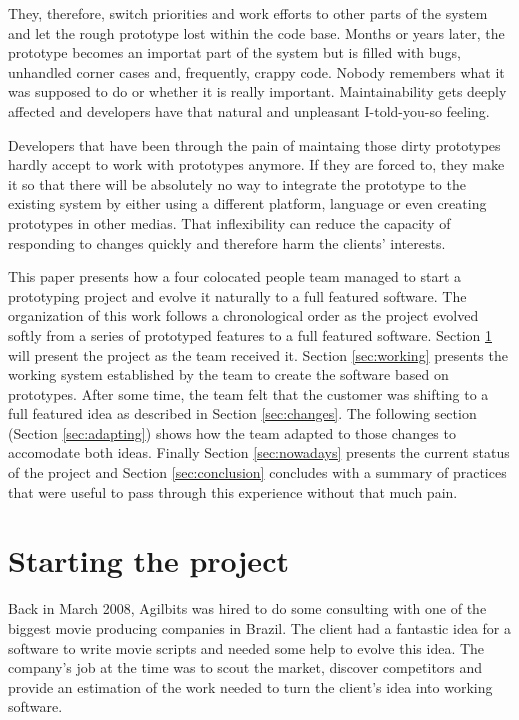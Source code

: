 \documentclass[lnbip]{svmultln}
\begin{document}
They, therefore, switch priorities and work efforts to other parts of
the system and let the rough prototype lost within the code
base. Months or years later, the prototype becomes an importat part of
the system but is filled with bugs, unhandled corner cases and,
frequently, crappy code. Nobody remembers what it was supposed to do
or whether it is really important. Maintainability gets deeply
affected and developers have that natural and unpleasant I-told-you-so
feeling.

Developers that have been through the pain of maintaing those dirty
prototypes hardly accept to work with prototypes anymore. If they are
forced to, they make it so that there will be absolutely no way to
integrate the prototype to the existing system by either using a
different platform, language or even creating prototypes in other
medias. That inflexibility can reduce the capacity of responding to
changes quickly and therefore harm the clients' interests.

This paper presents how a four colocated people team managed to start
a prototyping project and evolve it naturally to a full featured
software. The organization of this work follows a chronological order
as the project evolved softly from a series of prototyped features to
a full featured software. Section \ref{sec:start} will present the
project as the team received it. Section \ref{sec:working} presents
the working system established by the team to create the software
based on prototypes. After some time, the team felt that the customer
was shifting to a full featured idea as described in Section
\ref{sec:changes}. The following section (Section \ref{sec:adapting})
shows how the team adapted to those changes to accomodate both
ideas. Finally Section \ref{sec:nowadays} presents the current status
of the project and Section \ref{sec:conclusion} concludes with a
summary of practices that were useful to pass through this experience
without that much pain.

\section{Starting the project}
\label{sec:start}

Back in March 2008, Agilbits was hired to do some consulting with one
of the biggest movie producing companies in Brazil. The client had a
fantastic idea for a software to write movie scripts and needed some
help to evolve this idea. The company's job at the time was to scout
the market, discover competitors and provide an estimation of the work
needed to turn the client's idea into working software.
\end{document}
